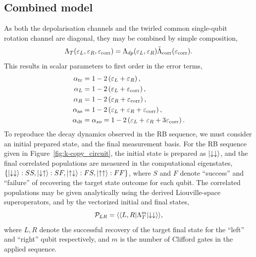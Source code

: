 \subsection{Combined model}
\label{app:combined_model}
As both the depolarisation channels and the twirled common single-qubit rotation channel are diagonal, they may be combined by simple composition,
\begin{equation}
    \Lambda_{T}(\varepsilon_L, \varepsilon_R,\varepsilon_{\rm corr})=\Lambda_{dp}(\varepsilon_L,\varepsilon_R)\tilde\Lambda_{\rm corr}(\varepsilon_{\rm corr}).
\end{equation}
This results in scalar parameters to first order in the error terms,
\begin{subequations}
\label{eqn:app_bases}
\begin{align}
    \alpha_{\rm tr} &= 1 - 2\left(\varepsilon_L+ \varepsilon_R\right),\\
    \alpha_L &= 1-2\left(\varepsilon_L+\varepsilon_{\rm corr}\right),\\
    \alpha_R &= 1-2\left(\varepsilon_R+\varepsilon_{\rm corr}\right),\\
    \alpha_{\rm as} &=  1 - 2\left(\varepsilon_L+\varepsilon_R +\varepsilon_{\rm corr}\right),\\
    \alpha_{\rm dt} &=\alpha_{so}= 1 - 2\left(\varepsilon_L+ \varepsilon_R +3\varepsilon_{\rm corr}\right).
\end{align}
\end{subequations}
To reproduce the decay dynamics observed in the RB sequence, we must consider an initial prepared state, and the final measurement basis.
For the RB sequence given in Figure~\ref{fig:k-copy_circuit}, the initial state is prepared as $\ket{\downarrow\downarrow}$, and the final correlated populations are measured in the computational eigenstates, $\{\ket{\downarrow\downarrow}: SS, \ket{\downarrow\uparrow}: SF, \ket{\uparrow\downarrow}: FS, \ket{\uparrow\uparrow}: FF\}$, where $S$ and $F$ denote ``success'' and ``failure'' of recovering the target state outcome for each qubit.
The correlated populations may be given analytically using the derived Liouville-space superoperators, and by the vectorized initial and final states,
\begin{equation}\label{eqn:rb_meas}
    \mathcal{P}_{LR}=\langle\langle L,R\lvert\Lambda_T^m\lvert\downarrow\downarrow\rangle\rangle,
\end{equation}
where $L,R$ denote the successful recovery of the target final state for the ``left'' and ``right'' qubit respectively, and $m$ is the number of Clifford gates in the applied sequence.
